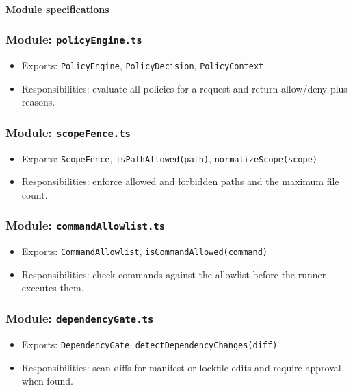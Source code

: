 \documentclass[11pt]{article}
\begin{document}
\paragraph{Module specifications}
\subsubsection*{Module: \texttt{policyEngine.ts}}
\begin{itemize}[noitemsep]
  \item Exports: \texttt{PolicyEngine}, \texttt{PolicyDecision}, \texttt{PolicyContext}
  \item Responsibilities: evaluate all policies for a request and return allow/deny plus reasons.
\end{itemize}

\subsubsection*{Module: \texttt{scopeFence.ts}}
\begin{itemize}[noitemsep]
  \item Exports: \texttt{ScopeFence}, \texttt{isPathAllowed(path)}, \texttt{normalizeScope(scope)}
  \item Responsibilities: enforce allowed and forbidden paths and the maximum file count.
\end{itemize}

\subsubsection*{Module: \texttt{commandAllowlist.ts}}
\begin{itemize}[noitemsep]
  \item Exports: \texttt{CommandAllowlist}, \texttt{isCommandAllowed(command)}
  \item Responsibilities: check commands against the allowlist before the runner executes them.
\end{itemize}

\subsubsection*{Module: \texttt{dependencyGate.ts}}
\begin{itemize}[noitemsep]
  \item Exports: \texttt{DependencyGate}, \texttt{detectDependencyChanges(diff)}
  \item Responsibilities: scan diffs for manifest or lockfile edits and require approval when found.
\end{itemize}
\end{document}
